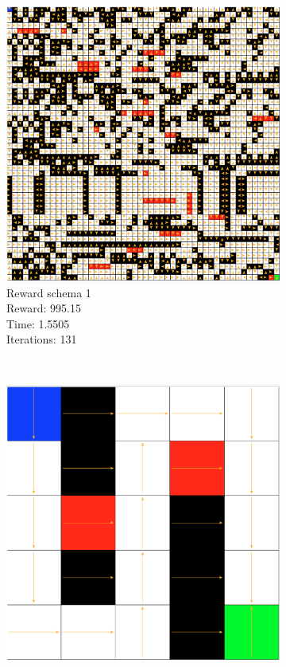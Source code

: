 \documentclass[a4paper,10pt]{article}
\begin{document}
\begin{figure}[h!]
        \centering
        \begin{subfigure}[b]{0.3\textwidth}
                \includegraphics[width=\textwidth]{figures/50x50_viter_r1.png}
                \caption{Reward schema 1\\
                Reward:  995.15\\
                Time:  1.5505\\
                Iterations: 131}
                \label{fig:gull}
        \end{subfigure}%
        ~ %
        \begin{subfigure}[b]{0.3\textwidth}
                \includegraphics[width=\textwidth]{figures/5x5_viter_r2.png}

\end{subfigure}
\end{figure}
\end{document}
